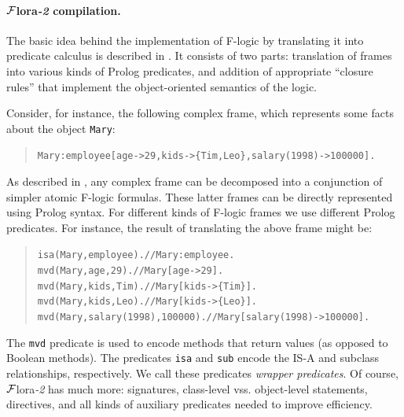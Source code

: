 \documentclass[11pt]{article}
\newcommand{\FLORA}{{\mbox{\sc ${\cal F}${lora}\rm\emph{-2}}}\xspace}
\newcommand{\FLSYSTEM}{\FLORA}
\newcommand{\fl}{\mbox{F-logic}\xspace}
\begin{document}
{\paragraph{\FLSYSTEM compilation.}
The basic idea behind the implementation of \fl by translating it into
predicate calculus is described in \cite{KLW95}. It consists of two parts:
translation of frames into various kinds of Prolog predicates, and
addition of appropriate ``closure rules'' that implement the
object-oriented semantics of the logic.

Consider, for instance, the following complex frame, which represents
some facts about the object \texttt{Mary}:

\begin{quote}
\begin{alltt}
Mary:employee[age->29, kids->\{Tim,Leo\}, salary(1998)->100000].
\end{alltt}
\end{quote}

As described in \cite{KLW95}, any complex frame can be
decomposed into a conjunction of simpler atomic \fl formulas. These
latter frames can be directly represented using Prolog syntax.  For
different kinds of \fl frames we use different Prolog predicates. For
instance, the result of translating the above frame might be:

\begin{quote}
\begin{alltt}
isa(Mary,employee).            // Mary:employee. \\
mvd(Mary,age,29).               // Mary[age->29]. \\
mvd(Mary,kids,Tim).            // Mary[kids->\{Tim\}]. \\
mvd(Mary,kids,Leo).            // Mary[kids->\{Leo\}]. \\
mvd(Mary,salary(1998),100000).  // Mary[salary(1998)->100000].
\end{alltt}
\end{quote}

The {\tt mvd} predicate is used to encode methods that return values (as
opposed to Boolean methods).
The predicates {\tt isa} and {\tt sub}
encode the IS-A and subclass relationships, respectively.
We call these predicates \emph{wrapper predicates}. 
Of course, \FLSYSTEM has much more: signatures, class-level
vss. object-level
statements, directives, and all kinds of auxiliary predicates
needed to improve efficiency.

}
\end{document}
